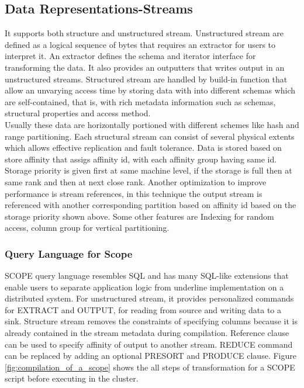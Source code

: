\documentclass[runningheads,a4paper]{llncs}
\begin{document}
{\subsection*{Data Representations-Streams}
It supports both structure and unstructured stream. Unstructured stream are defined as a logical sequence of bytes that requires an extractor for users to interpret it. An extractor defines the schema and iterator interface for transforming the data. It also provides an outputters that writes output in an unstructured streams. Structured stream are handled by build-in function that allow an unvarying access time by storing data with into different schemas which are self-contained, that is, with rich metadata information such as schemas, structural properties and access method.\\

Usually these data are horizontally portioned with different schemes like hash and range partitioning. Each structural stream can consist of several physical extents which allows effective replication and fault tolerance. Data is stored based on store affinity that assigs affinity id, with each affinity group having same id. Storage priority is given first at same machine level, if the storage is full then at same rank and then at next close rank.  Another optimization to improve performance is stream references, in this technique the output stream is referenced with another corresponding partition based on affinity id based on the storage priority shown above. Some other features are Indexing for random access, column group for vertical partitioning.  \\

\subsubsection{Query Language for Scope}
SCOPE query language resembles SQL and has many SQL-like extensions that enable users to separate application logic from underline implementation on a distributed system. For unstructured stream, it provides personalized commands for EXTRACT and OUTPUT, for reading from source and writing data to a sink. Structure stream removes the constraints of specifying columns because it is already contained in the stream metadata during compilation. Reference clause can be used to specify affinity of output to another stream. REDUCE command can be replaced by adding an optional PRESORT and PRODUCE clause. Figure \ref{fig:compilation_of_a_scope} shows the all steps of transformation for a SCOPE script before executing in the cluster. 

}
\end{document}
